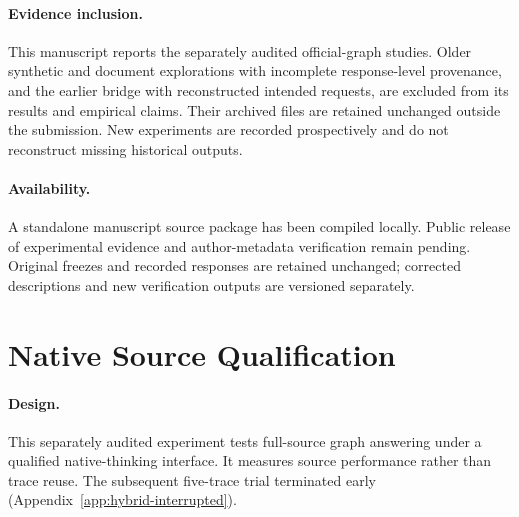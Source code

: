 \documentclass[10pt]{article}
\begin{document}
\paragraph{Evidence inclusion.} This manuscript reports the separately audited official-graph studies. Older synthetic and document explorations with incomplete response-level provenance, and the earlier bridge with reconstructed intended requests, are excluded from its results and empirical claims. Their archived files are retained unchanged outside the submission. New experiments are recorded prospectively and do not reconstruct missing historical outputs.

\paragraph{Availability.} A standalone manuscript source package has been compiled locally. Public release of experimental evidence and author-metadata verification remain pending. Original freezes and recorded responses are retained unchanged; corrected descriptions and new verification outputs are versioned separately.

\section{Native Source Qualification}
\label{app:hybrid-source}

\paragraph{Design.} This separately audited experiment tests full-source graph answering under a qualified native-thinking interface. It measures source performance rather than trace reuse. The subsequent five-trace trial terminated early (Appendix~\ref{app:hybrid-interrupted}).
\end{document}
